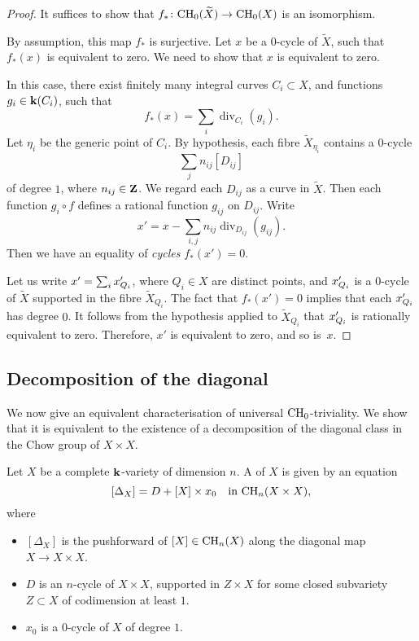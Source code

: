 \begin{proof}
    It suffices to show that $f_* \colon \mathrm{CH}_0 (\widetilde{X}) \to \mathrm{CH}_0 (X)$ is an isomorphism.

    By assumption, this map $f_*$ is surjective.
    Let $x$ be a $0$-cycle of $\widetilde{X}$,
    such that $f_* (x)$ is equivalent to zero.
    We need to show that $x$ is equivalent to zero.

    In this case, there exist finitely many integral curves $C_i \subset X$,
    and functions $g_i \in \bbk (C_i)$, such that
    \[ \textstyle f_* (x) = \sum_i \operatorname{div}_{C_i} (g_i). \]
    Let $\eta_i$ be the generic point of $C_i$.
    By hypothesis, each fibre $\widetilde{X}_{\eta_i}$ contains a $0$-cycle
    \[ \textstyle \sum_j n_{ij} [D_{ij}] \]
    of degree $1$, where $n_{ij} \in \bbZ$.
    We regard each $D_{ij}$ as a curve in $\widetilde{X}$.
    Then each function $g_i \circ f$ defines a rational function $g_{ij}$ on $D_{ij}$.
    Write
    \[ \textstyle x' = x - \sum_{i,j} n_{ij} \operatorname{div}_{D_{ij}} (g_{ij}). \]
    Then we have an equality of \emph{cycles} $f_* (x') = 0$.

    Let us write $x' = \sum_i x'_{\smash{Q_i}}$, where $Q_i \in X$ are distinct points, 
    and $x'_{\smash{Q_i}}$ is a $0$-cycle of $\widetilde{X}$ supported in the fibre $\widetilde{X}_{Q_i}$.
    The fact that $f_* (x') = 0$ implies that each $x'_{\smash{Q_i}}$ has degree $0$.
    It follows from the hypothesis applied to $\widetilde{X}_{Q_i}$ that $x'_{\smash{Q_i}}$ is rationally equivalent to zero.
    Therefore, $x'$ is equivalent to zero, and so is~$x$.
\end{proof}


\subsection{Decomposition of the diagonal}

We now give an equivalent characterisation of universal $\mathrm{CH}_0$-triviality.
We show that it is equivalent to the existence of a decomposition 
of the diagonal class in the Chow group of $X \times X$.

\begin{definition} \label{def-2-decomp}
    Let $X$ be a complete $\bbk$-variety of dimension $n$.
    A  of $X$ is given by an equation
    \[ [\Delta_X] = D + [X] \times x_0 \quad \text{in } \mathrm{CH}_n (X \times X), \]
    where
    \begin{itemize}
        \item
            $[\Delta_X]$ is the pushforward of $[X] \in \mathrm{CH}_n (X)$
            along the diagonal map $X \to X \times X$.

        \item
            $D$ is an $n$-cycle of $X \times X$, supported in $Z \times X$
            for some closed subvariety $Z \subset X$ of codimension at least $1$.

        \item
            $x_0$ is a $0$-cycle of $X$ of degree $1$.
    \end{itemize}
\end{definition}

